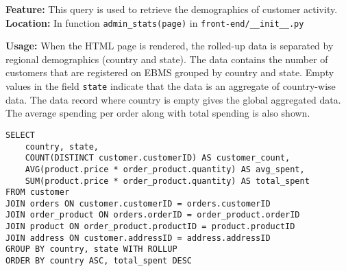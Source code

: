 \textbf{Feature:} This query is used to retrieve the demographics of customer activity. \\
\textbf{Location:} In function \texttt{admin\_stats(page)} in \texttt{front-end/\_\_init\_\_.py}

\textbf{Usage:}
When the HTML page is rendered, the rolled-up data is separated by regional demographics (country and state).
The data contains the number of customers that are registered on EBMS grouped by country and state.
Empty values in the field \texttt{state} indicate that the data is an aggregate of country-wise data.
The data record where country is empty gives the global aggregated data.
The average spending per order along with total spending is also shown.

\vspace*{30pt}

\begin{lstlisting}
SELECT
    country, state,
    COUNT(DISTINCT customer.customerID) AS customer_count,
    AVG(product.price * order_product.quantity) AS avg_spent,
    SUM(product.price * order_product.quantity) AS total_spent
FROM customer
JOIN orders ON customer.customerID = orders.customerID
JOIN order_product ON orders.orderID = order_product.orderID
JOIN product ON order_product.productID = product.productID
JOIN address ON customer.addressID = address.addressID
GROUP BY country, state WITH ROLLUP
ORDER BY country ASC, total_spent DESC
\end{lstlisting}
